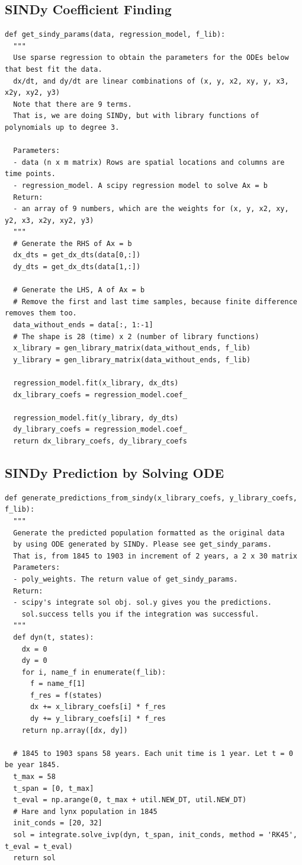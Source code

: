 \documentclass[letterpaper, 10 pt, conference]{ieeeconf}  %
\begin{document}
\subsection*{SINDy Coefficient Finding}
\begin{verbatim}
def get_sindy_params(data, regression_model, f_lib):
  """
  Use sparse regression to obtain the parameters for the ODEs below that best fit the data.
  dx/dt, and dy/dt are linear combinations of (x, y, x2, xy, y, x3, x2y, xy2, y3)
  Note that there are 9 terms.
  That is, we are doing SINDy, but with library functions of polynomials up to degree 3.
  
  Parameters:
  - data (n x m matrix) Rows are spatial locations and columns are time points.
  - regression_model. A scipy regression model to solve Ax = b
  Return:
  - an array of 9 numbers, which are the weights for (x, y, x2, xy, y2, x3, x2y, xy2, y3)
  """
  # Generate the RHS of Ax = b
  dx_dts = get_dx_dts(data[0,:])
  dy_dts = get_dx_dts(data[1,:])
  
  # Generate the LHS, A of Ax = b
  # Remove the first and last time samples, because finite difference removes them too.
  data_without_ends = data[:, 1:-1]
  # The shape is 28 (time) x 2 (number of library functions)
  x_library = gen_library_matrix(data_without_ends, f_lib)
  y_library = gen_library_matrix(data_without_ends, f_lib)
  
  regression_model.fit(x_library, dx_dts)
  dx_library_coefs = regression_model.coef_

  regression_model.fit(y_library, dy_dts)
  dy_library_coefs = regression_model.coef_
  return dx_library_coefs, dy_library_coefs
\end{verbatim}

\subsection*{SINDy Prediction by Solving ODE}
\begin{verbatim}
def generate_predictions_from_sindy(x_library_coefs, y_library_coefs, f_lib):
  """
  Generate the predicted population formatted as the original data
  by using ODE generated by SINDy. Please see get_sindy_params.
  That is, from 1845 to 1903 in increment of 2 years, a 2 x 30 matrix
  Parameters:
  - poly_weights. The return value of get_sindy_params.
  Return:
  - scipy's integrate sol obj. sol.y gives you the predictions.
    sol.success tells you if the integration was successful.
  """
  def dyn(t, states):
    dx = 0
    dy = 0
    for i, name_f in enumerate(f_lib):
      f = name_f[1]
      f_res = f(states)
      dx += x_library_coefs[i] * f_res
      dy += y_library_coefs[i] * f_res
    return np.array([dx, dy])

  # 1845 to 1903 spans 58 years. Each unit time is 1 year. Let t = 0 be year 1845.
  t_max = 58
  t_span = [0, t_max]
  t_eval = np.arange(0, t_max + util.NEW_DT, util.NEW_DT)
  # Hare and lynx population in 1845
  init_conds = [20, 32]
  sol = integrate.solve_ivp(dyn, t_span, init_conds, method = 'RK45', t_eval = t_eval)
  return sol
\end{verbatim}
\end{document}
